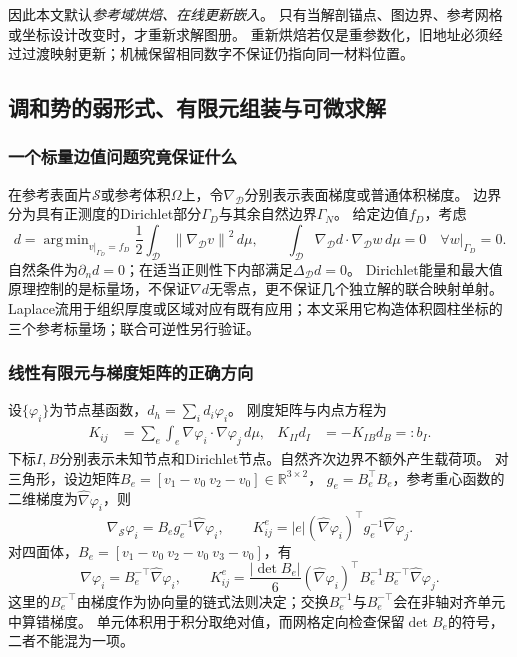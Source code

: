 \documentclass[11pt,a4paper]{article}
\numberwithin{equation}{section}
\theoremstyle{definition}
\DeclareMathOperator{\argmin}{arg\,min}
\newcommand{\R}{\mathbb R}
\newcommand{\norm}[1]{\left\lVert#1\right\rVert}
\begin{document}
因此本文默认\emph{参考域烘焙、在线更新嵌入}。
只有当解剖锚点、图边界、参考网格或坐标设计改变时，才重新求解图册。
重新烘焙若仅是重参数化，旧地址必须经过过渡映射更新；机械保留相同数字不保证仍指向同一材料位置。

\subsection{调和势的弱形式、有限元组装与可微求解}
\label{geo:sub:harmonic}

\subsubsection{一个标量边值问题究竟保证什么}
在参考表面片$\mathcal S$或参考体积$\Omega$上，令$\nabla_{\mathcal D}$分别表示表面梯度或普通体积梯度。
边界分为具有正测度的Dirichlet部分$\Gamma_D$与其余自然边界$\Gamma_N$。
给定边值$f_D$，考虑
\begin{equation}
 d=\argmin_{v|_{\Gamma_D}=f_D}
       \frac12\int_{\mathcal D}\norm{\nabla_{\mathcal D}v}^{2}\,d\mu,
 \qquad
 \int_{\mathcal D}\nabla_{\mathcal D}d\cdot
                    \nabla_{\mathcal D}w\,d\mu=0
 \quad\forall w|_{\Gamma_D}=0.
 \label{geo:eq:harmonic-weak}
\end{equation}
自然条件为$\partial_n d=0$；在适当正则性下内部满足$\Delta_{\mathcal D}d=0$。
Dirichlet能量和最大值原理控制的是标量场，不保证$\nabla d$无零点，更不保证几个独立解的联合映射单射。
Laplace流用于组织厚度或区域对应有既有应用\cite{geoJones2000}；本文采用它构造体积圆柱坐标的三个参考标量场；联合可逆性另行验证。

\subsubsection{线性有限元与梯度矩阵的正确方向}
设$\{\varphi_i\}$为节点基函数，$d_h=\sum_i d_i\varphi_i$。
刚度矩阵与内点方程为
\begin{align}
 K_{ij}&=\sum_{e}\int_e\nabla\varphi_i\cdot\nabla\varphi_j\,d\mu,
 &K_{II}d_I&=-K_{IB}d_B=:b_I.
 \label{geo:eq:fem-system}
\end{align}
下标$I,B$分别表示未知节点和Dirichlet节点。自然齐次边界不额外产生载荷项。
对三角形，设边矩阵$B_e=[v_1-v_0\ v_2-v_0]\in\R^{3\times2}$，
$g_e=B_e^{\top}B_e$，参考重心函数的二维梯度为$\widehat\nabla\varphi_i$，则
\begin{equation}
 \nabla_{\mathcal S}\varphi_i=B_e g_e^{-1}\widehat\nabla\varphi_i,
 \qquad
 K^e_{ij}=|e|(\widehat\nabla\varphi_i)^{\top}
                    g_e^{-1}\widehat\nabla\varphi_j.
 \label{geo:eq:triangle-fem}
\end{equation}
对四面体，$B_e=[v_1-v_0\ v_2-v_0\ v_3-v_0]$，有
\begin{equation}
 \nabla\varphi_i=B_e^{-\top}\widehat\nabla\varphi_i,
 \qquad
 K^e_{ij}=\frac{|\det B_e|}{6}
      (\widehat\nabla\varphi_i)^{\top}B_e^{-1}B_e^{-\top}
                \widehat\nabla\varphi_j.
 \label{geo:eq:tet-fem}
\end{equation}
这里的$B_e^{-\top}$由梯度作为协向量的链式法则决定；交换$B_e^{-1}$与$B_e^{-\top}$会在非轴对齐单元中算错梯度。
单元体积用于积分取绝对值，而网格定向检查保留$\det B_e$的符号，二者不能混为一项。
\end{document}
